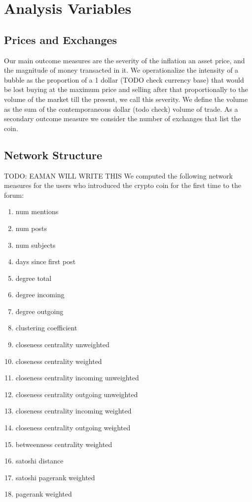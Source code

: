 \section{Analysis Variables}
\subsection{Prices and Exchanges}
Our main outcome measures are the severity of the inflation an asset price, and the magnitude of money transacted in it.
We operationalize the intensity of a bubble as the proportion of a 1 dollar (TODO check currency base) that would be lost buying at the maximum price and selling after that proportionally to the volume of the market till the present, we call this severity.
We define the volume as the sum of the contemporaneous dollar (todo check) volume of trade.
As a secondary outcome measure we consider the number of exchanges that list the coin.


\subsection{Network Structure}
TODO: EAMAN WILL WRITE THIS
We computed the following network measures for the users who introduced the
crypto coin for the first time to the forum:
\begin{enumerate}
  \item{num mentions}
  \item{num posts}
  \item{num subjects}
  \item{days since first post}
  \item{degree total}
  \item{degree incoming}
  \item{degree outgoing}
  \item{clustering coefficient}
  \item{closeness centrality unweighted}
  \item{closeness centrality weighted}
  \item{closeness centrality incoming unweighted}
  \item{closeness centrality outgoing unweighted}
  \item{closeness centrality incoming weighted}
  \item{closeness centrality outgoing weighted}
  \item{betweenness centrality weighted}
  \item{satoshi distance}
  \item{satoshi pagerank weighted}
  \item{pagerank weighted}
\end{enumerate}
